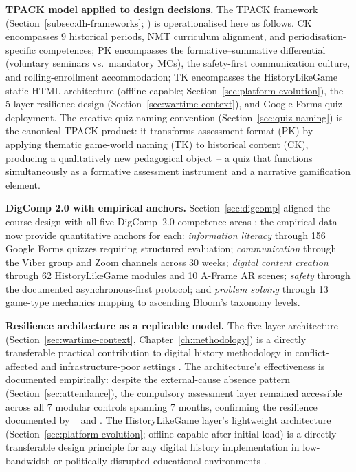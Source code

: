\textbf{TPACK model applied to design decisions.}
The TPACK framework (Section~\ref{subsec:dh-frameworks}; \cite{Mishra2006, Koehler2013})
is operationalised here as follows.
CK encompasses 9 historical periods, NMT curriculum alignment,
and periodisation-specific competences; PK encompasses the formative--summative
differential (voluntary seminars vs.\ mandatory MCs), the safety-first communication
culture, and rolling-enrollment accommodation; TK encompasses the HistoryLikeGame
static HTML architecture (offline-capable; Section~\ref{sec:platform-evolution}),
the 5-layer resilience design (Section~\ref{sec:wartime-context}), and Google Forms
quiz deployment.
The creative quiz naming convention (Section~\ref{sec:quiz-naming}) is the canonical
TPACK product: it transforms assessment format (PK) by applying thematic game-world
naming (TK) to historical content (CK), producing a qualitatively new pedagogical
object~-- a quiz that functions simultaneously as a formative assessment instrument
and a narrative gamification element.

\textbf{DigComp 2.0 with empirical anchors.}
Section~\ref{sec:digcomp} aligned the course design with all five DigComp~2.0 competence areas \cite{Vuorikari2016, Titova2025cte}; the empirical data now provide quantitative anchors for each: \emph{information literacy} through 156 Google Forms quizzes requiring structured evaluation; \emph{communication} through the Viber group and Zoom channels across 30 weeks; \emph{digital content creation} through 62 HistoryLikeGame modules and 10 A-Frame AR scenes; \emph{safety} through the documented asynchronous-first protocol; and \emph{problem solving} through 13 game-type mechanics mapping to ascending Bloom's taxonomy levels.

\textbf{Resilience architecture as a replicable model.}
The five-layer architecture (Section~\ref{sec:wartime-context}, Chapter~\ref{ch:methodology})
is a directly transferable practical contribution to digital history methodology in
conflict-affected and infrastructure-poor settings \cite{Burde2017, UNESCO2023}.
The architecture's effectiveness is documented empirically: despite the external-cause
absence pattern (Section~\ref{sec:attendance}), the compulsory assessment layer
remained accessible across all 7 modular controls spanning 7 months, confirming
the resilience documented by \citeauthor{Martynets202428}~\cite{Martynets202428} and \cite{Zamkova2023299}.
The HistoryLikeGame layer's lightweight architecture (Section~\ref{sec:platform-evolution}; offline-capable after initial load) is a directly
transferable design principle for any digital history implementation in low-bandwidth
or politically disrupted educational environments \cite{Hlianenko2024}.


